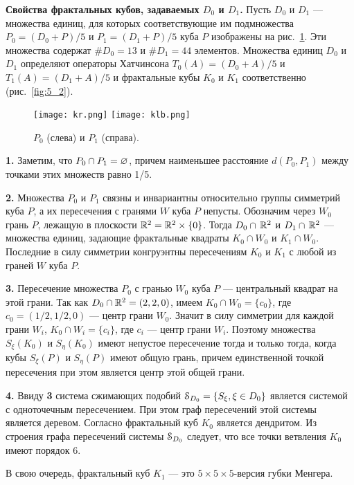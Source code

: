{\bf Свойства фрактальных кубов, задаваемых $ D_0$ и  $ D_1$.}
Пусть $ D_0$ и $ D_1$ --- множества единиц, для которых соответствующие им подмножества $P_0=( D_0+P)/5$  и $P_1=( D_1+P)/5$ куба $P$ изображены на рис.~\ref{fig:5_1}. 
Эти множества содержат $\# D_0=13$ и $\# D_1= 44$ элементов.
 Множества единиц $ D_0$ и $ D_1$ определяют операторы Хатчинсона $ T_0(A)=( D_0+A)/{5}$   и $T_1(A)=( D_1+A)/{5}$   и фрактальные кубы $K_0$ и $K_1$ соответственно (рис.~\ref{fig:5_2}).

\begin{figure}[H]
\centering
\qquad\qquad\texttt{[image: kr.png]}
\hfill
\texttt{[image: klb.png]}\qquad\qquad
\caption{ $P_0$ (слева)  и $P_1$ (справа).}
\label{fig:5_1}
\end{figure}


{\bf 1.} Заметим, что $P_0\cap P_1=\varnothing$, причем наименьшее расстояние $d(P_0,P_1)$ между точками этих множеств  равно 1/5.\smallskip

{\bf 2.} Множества $P_0$ и $P_1$ связны  и  инвариантны относительно группы симметрий куба $P$,  а их пересечения с гранями $W$ куба $P$ непусты. 
Обозначим через $W_0$   грань  $P$, лежащую в плоскости $\mathbb{R}^2=\mathbb{R}^2\times\{0\}$. 
Тогда $ D_0\cap\, \mathbb{R}^2$ и $ D_1\cap\, \mathbb{R}^2$ --- множества единиц, задающие фрактальные квадраты $K_0\cap W_0$ и $K_1\cap W_0$. 
Последние в силу симметрии конгруэнтны пересечениям $K_0$ и $K_1$ с любой из граней $W$ куба $P$.\smallskip

{\bf 3.} Пересечение множества $P_0$  с гранью $W_0$ куба $P$ --- центральный квадрат  на этой грани. 
Так как $ D_0\cap \mathbb{R}^2=(2,2,0)$,  имеем $K_0\cap W_0=\{c_0\} $, где $c_0=(1/2,1/2,0)$ --- центр грани $W_0$. 
Значит в силу симметрии для каждой грани $W_i$,  $K_0\cap W_i=\{c_i\} $, где $c_i$ --- центр грани $W_i$. 
Поэтому множества $S_\xi(K_0)$ и $S_\eta(K_0)$ имеют непустое пересечение тогда и только тогда, когда кубы  $S_\xi(P)$ и $S_\eta(P)$ имеют общую грань, причем   единственной точкой пересечения при этом является центр этой общей грани.\smallskip

{\bf 4.} Ввиду {\bf 3} система сжимающих подобий ${\EuScript S}_{ D_0}=\{S_\xi,\xi\in  D_0\}$ является системой с одноточечным пересечением. 
При этом  граф пересечений этой системы является деревом. 
Согласно \cite[Theorem 1.7]{FIP} фрактальный куб $K_0$ является дендритом.
Из строения графа пересечений системы ${\EuScript S}_{ D_0}$ следует, что  все точки ветвления $K_0$ имеют порядок 6.\smallskip

В свою очередь, фрактальный куб $ K_1$ --- это $ 5\times 5\times 5 $-версия губки Менгера.


